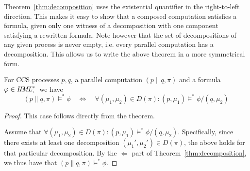Theorem~\ref{thm:decomposition} uses the existential quantifier in the right-to-left
direction. This makes it easy to show that a composed computation satisfies a
formula, given only one witness of a decomposition with one component satisfying
a rewritten formula. Note however that the set of decompositions of any given
process is never empty, i.e. every parallel computation has a decomposition.
This allows us to write the above theorem in a more symmetrical form.
\begin{corollary}
    For CCS processes $p,q$, a parallel computation $(p \parallel q, \pi)$
    and a formula $\varphi \in \textit{HML}_\shortleftarrow^*$ we have
    \begin{equation}\label{eq:decomp_bi}
        (p\parallel q, \pi) \vDash^* \phi  \quad\Leftrightarrow\quad
        \forall (\mu_1,\mu_2) \in D(\pi) : (p, \mu_1) \vDash^* \phi/(q, \mu_2)
    \end{equation}
\end{corollary}
\begin{proof}
    \ltr This case follows directly from the theorem.
    
    \rtl Assume that $\forall (\mu_1,\mu_2) \in D(\pi) : (p, \mu_1) \vDash^* \phi/(q, \mu_2)$.
    Specifically, since there exists at least one decomposition $(\mu_1',\mu_2')\in D(\pi)$,
    the above holds for that particular decomposition. By the $\Leftarrow$ part of
    Theorem~\ref{thm:decomposition}, we thus have that \mbox{$(p\parallel q,\pi)\vDash^*\phi$}.
\end{proof}
